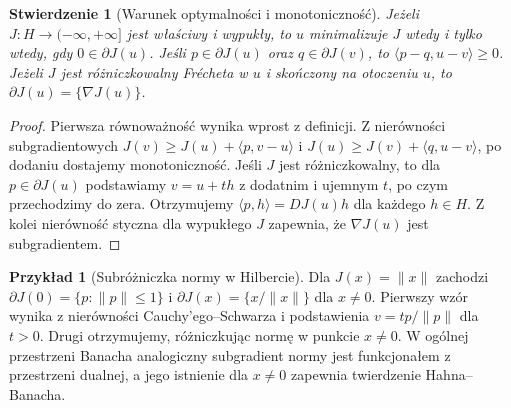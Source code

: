 \documentclass[11pt,a4paper]{article}
\numberwithin{equation}{section}
\theoremstyle{plain}
\newtheorem{stwierdzenie}[twierdzenie]{Stwierdzenie}
\theoremstyle{definition}
\newtheorem{przyklad}[twierdzenie]{Przykład}
\theoremstyle{remark}
\begin{document}
\begin{stwierdzenie}[Warunek optymalności i monotoniczność]
\label{prop:subgrad16}
Jeżeli $J:H\to(-\infty,+\infty]$ jest właściwy i wypukły,
to $u$ minimalizuje $J$ wtedy i tylko wtedy, gdy
$0\in\partial J(u)$. Jeśli $p\in\partial J(u)$ oraz
$q\in\partial J(v)$, to
$\langle p-q,u-v\rangle\ge0$.
Jeżeli $J$ jest różniczkowalny Frécheta w $u$ i skończony
na otoczeniu $u$, to $\partial J(u)=\{\nabla J(u)\}$.
\end{stwierdzenie}
\begin{proof}
Pierwsza równoważność wynika wprost z definicji.
Z nierówności subgradientowych
$J(v)\ge J(u)+\langle p,v-u\rangle$ i
$J(u)\ge J(v)+\langle q,u-v\rangle$,
po dodaniu dostajemy monotoniczność.
Jeśli $J$ jest różniczkowalny, to dla $p\in\partial J(u)$
podstawiamy $v=u+th$ z dodatnim i ujemnym $t$,
po czym przechodzimy do zera. Otrzymujemy
$\langle p,h\rangle=DJ(u)h$ dla każdego $h\in H$.
Z kolei nierówność styczna dla wypukłego $J$
zapewnia, że $\nabla J(u)$ jest subgradientem.
\end{proof}

\begin{przyklad}[Subróżniczka normy w Hilbercie]
\label{ex:norm-subgrad16}
Dla $J(x)=\|x\|$ zachodzi
$\partial J(0)=\{p:\|p\|\le1\}$ i
$\partial J(x)=\{x/\|x\|\}$ dla $x\ne0$.
Pierwszy wzór wynika z nierówności Cauchy'ego--Schwarza
i podstawienia $v=tp/\|p\|$ dla $t>0$.
Drugi otrzymujemy, różniczkując normę w punkcie $x\ne0$.
W ogólnej przestrzeni Banacha analogiczny subgradient normy
jest funkcjonałem z przestrzeni dualnej, a jego istnienie
dla $x\ne0$ zapewnia twierdzenie Hahna--Banacha.
\end{przyklad}
\end{document}
